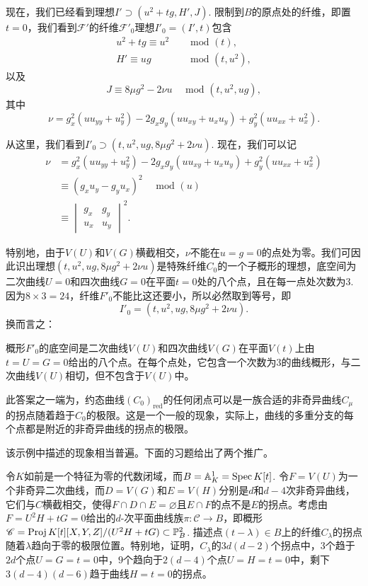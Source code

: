 现在，我们已经看到理想$I'\supset (u^2+tg,H',J)$. 限制到$B$的原点处的纤维，即置$t=0$，我们看到$\mathscr F'$的纤维$\mathscr F'_0$理想$I'_0=(I',t)$包含
\[
	\begin{aligned}
		u^2+tg \equiv u^2 &\quad \text{ mod } (t),\\
		H' \equiv ug &\quad \text{ mod } (t,u^2),
	\end{aligned}
\]
以及
\[
	J\equiv 8\mu g^2-2\nu u\quad \text{ mod } (t,u^2,ug),
\]
其中
\[
	\nu=g_x^2(uu_{yy}+u_y^2)-2g_xg_y(uu_{xy}+u_xu_y)+g_y^2(uu_{xx}+u_x^2).
\]

从这里，我们看到$I'_0\supset (t,u^2,ug,8\mu g^2+2\nu u)$. 现在，我们可以记
\[
	\begin{aligned}
		\nu &=g_x^2(uu_{yy}+u_y^2)-2g_xg_y(uu_{xy}+u_xu_y)+g_y^2(uu_{xx}+u_x^2)\\
		&\equiv (g_xu_y-g_yu_x)^2\quad \text{ mod } (u)\\
		&\equiv \begin{vmatrix}
			g_x&g_y\\
			u_x&u_y
		\end{vmatrix}^2.
	\end{aligned}
\]

特别地，由于$V(U)$和$V(G)$横截相交，$\nu$不能在$u=g=0$的点处为零。我们可因此识出理想$(t,u^2,ug,8\mu g^2+2\nu u)$是特殊纤维$C_0$的一个子概形的理想，底空间为二次曲线$U=0$和四次曲线$G=0$在平面$t=0$处的八个点，且在每一点处次数为$3$. 因为$8\times 3=24$，纤维$F'_0$不能比这还要小，所以必然取到等号，即
\[
	I'_0=(t,u^2,ug,8\mu g^2+2\nu u).
\]
换而言之：

\begin{pro}\label{pro:4.10}
	概形$F'_0$的底空间是二次曲线$V(U)$和四次曲线$V(G)$在平面$V(t)$上由$t=U=G=0$给出的八个点。在每个点处，它包含一个次数为$3$的曲线概形，与二次曲线$V(U)$相切，但不包含于$V(U)$中。
\end{pro}

此答案之一端为，约态曲线$(C_0)_{\text{red}}$的任何闭点可以是一族合适的非奇异曲线$C_\mu$的拐点随着趋于$C_0$的极限。这是一个一般的现象，实际上，曲线的多重分支的每个点都是附近的非奇异曲线的拐点的极限。

该示例中描述的现象相当普遍。下面的习题给出了两个推广。

\begin{exe}\label{exe:4.11}
	令$K$如前是一个特征为零的代数闭域，而$B=\mathbb A_K^1=\operatorname{Spec} K[t]$. 令$F=V(U)$为一个非奇异二次曲线，而$D=V(G)$和$E=V(H)$分别是$d$和$d-4$次非奇异曲线，它们与$C$横截相交，使得$F\cap D\cap E=\varnothing$且$E\cap F$的点不是$E$的拐点。考虑由$F=U^2H+tG=0$给出的$d$-次平面曲线族$\pi:\mathscr C\to B$，即概形$\mathscr C=\operatorname{Proj} K[t][X,Y,Z]/(U^2H+tG)\subset \mathbb P_B^2$. 描述点$(t-\lambda)\in B$上的纤维$C_\lambda$的拐点随着$\lambda$趋向于零的极限位置。特别地，证明，$C_\lambda$的$3d(d-2)$个拐点中，$3$个趋于$2d$个点$U=G=t=0$中，$9$个趋向于$2(d-4)$个点$U=H=t=0$中，剩下$3(d-4)(d-6)$趋于曲线$H=t=0$的拐点。\nottran
\end{exe}

